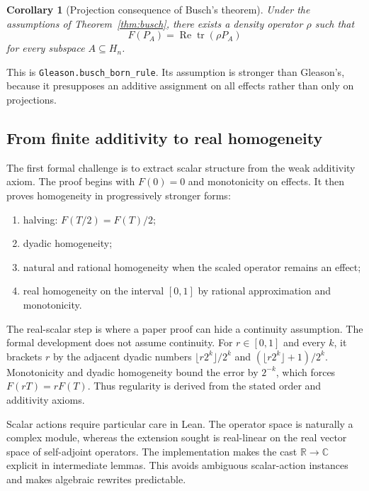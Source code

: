 \documentclass[pdflatex,sn-mathphys-num]{sn-jnl}
\providecommand{\passthrough}[1]{#1}
\theoremstyle{thmstyleone}
\newtheorem{corollary}[theorem]{Corollary}
\theoremstyle{thmstylethree}
\begin{document}
\begin{corollary}[Projection consequence of Busch's theorem]\label{cor:busch-projection}
Under the assumptions of Theorem~\ref{thm:busch}, there exists a density operator \(\rho\) such that
\[
F(P_A)=\operatorname{Re}\operatorname{tr}(\rho P_A)
\]
for every subspace \(A\subseteq H_n\).
\end{corollary}

This is \passthrough{\lstinline!Gleason.busch_born_rule!}. Its assumption is stronger than Gleason's, because it presupposes an additive assignment on all effects rather than only on projections.

\subsection{From finite additivity to real homogeneity}\label{from-finite-additivity-to-real-homogeneity}

The first formal challenge is to extract scalar structure from the weak additivity axiom. The proof begins with \(F(0)=0\) and monotonicity on effects. It then proves homogeneity in progressively stronger forms:

\begin{enumerate}
\def\labelenumi{\arabic{enumi}.}
\item
  halving: \(F(T/2)=F(T)/2\);
\item
  dyadic homogeneity;
\item
  natural and rational homogeneity when the scaled operator remains an effect;
\item
  real homogeneity on the interval \([0,1]\) by rational approximation and monotonicity.
\end{enumerate}

The real-scalar step is where a paper proof can hide a continuity assumption. The formal development does not assume continuity. For \(r\in[0,1]\) and every \(k\), it brackets \(r\) by the adjacent dyadic numbers \(\lfloor r2^k\rfloor/2^k\) and \((\lfloor r2^k\rfloor+1)/2^k\). Monotonicity and dyadic homogeneity bound the error by \(2^{-k}\), which forces \(F(rT)=rF(T)\). Thus regularity is derived from the stated order and additivity axioms.

Scalar actions require particular care in Lean. The operator space is naturally a complex module, whereas the extension sought is real-linear on the real vector space of self-adjoint operators. The implementation makes the cast \(\mathbb R\to\mathbb C\) explicit in intermediate lemmas. This avoids ambiguous scalar-action instances and makes algebraic rewrites predictable.
\end{document}
